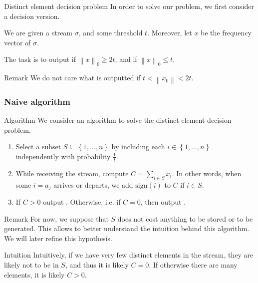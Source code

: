 \documentclass[a4paper]{article}
\begin{document}
\begin{parag}{Distinct element decision problem}
    In order to solve our problem, we first consider a decision version.

    We are given a stream $\sigma$, and some threshold $t$. Moreover, let $x$ be the frequency vector of $\sigma$.

    The task is to output  if $\left\|x\right\|_0 \geq 2t$, and  if $\left\|x\right\|_0 \leq t$.

    \begin{subparag}{Remark}
        We do not care what is outputted if $t < \left\|x_0\right\| < 2t$.
    \end{subparag}
\end{parag}

\subsubsection{Naive algorithm}
\begin{parag}{Algorithm}
    We consider an algorithm to solve the distinct element decision problem.
    \begin{enumerate}[left=0pt]
        \item Select a subset $S \subseteq \left\{1, \ldots, n\right\}$ by including each $i \in \left\{1, \ldots, n\right\}$ independently with probability $\frac{1}{t}$.
        \item While receiving the stream, compute $C = \sum_{i \in S} x_i$. In other words, when some $i = a_j$ arrives or departs, we add $\text{sign}\left(i\right)$ to $C$ if $i \in S$.
        \item If $C > 0$ output . Otherwise, i.e. if $C = 0$, then output .
    \end{enumerate}

    \begin{subparag}{Remark}
        For now, we suppose that $S$ does not cost anything to be stored or to be generated. This allows to better understand the intuition behind this algorithm. We will later refine this hypothesis.
    \end{subparag}
    
    \begin{subparag}{Intuition}
        Intuitively, if we have very few distinct elements in the stream, they are likely not to be in $S$, and thus it is likely $C = 0$. If otherwise there are many elements, it is likely $C > 0$.
    \end{subparag}
\end{parag}
\end{document}
